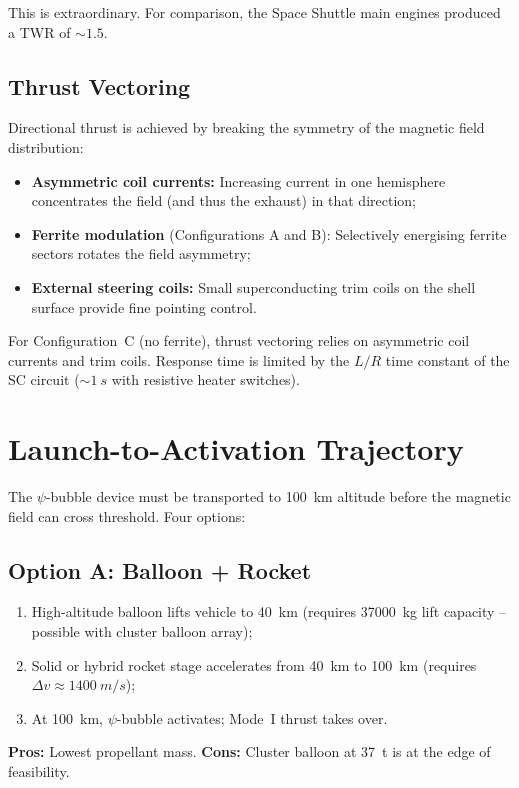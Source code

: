 \documentclass[11pt,a4paper]{article}
\begin{document}
This is extraordinary. For comparison, the Space Shuttle main engines
produced a TWR of $\sim\!1.5$.

\subsection{Thrust Vectoring}

Directional thrust is achieved by breaking the symmetry of the magnetic
field distribution:
\begin{itemize}[nosep]
\item \textbf{Asymmetric coil currents:} Increasing current in one hemisphere
concentrates the field (and thus the exhaust) in that direction;
\item \textbf{Ferrite modulation} (Configurations A and B): Selectively
energising ferrite sectors rotates the field asymmetry;
\item \textbf{External steering coils:} Small superconducting trim coils
on the shell surface provide fine pointing control.
\end{itemize}

For Configuration~C (no ferrite), thrust vectoring relies on asymmetric
coil currents and trim coils. Response time is limited by the $L/R$ time
constant of the SC circuit ($\sim\!\SI{1}{s}$ with resistive heater switches).

\section{Launch-to-Activation Trajectory}\label{sec:launch}

The $\psi$-bubble device must be transported to \SI{100}{km} altitude before
the magnetic field can cross threshold. Four options:

\subsection{Option A: Balloon + Rocket}

\begin{enumerate}[nosep]
\item High-altitude balloon lifts vehicle to \SI{40}{km} (requires
\SI{37000}{kg} lift capacity -- possible with cluster balloon array);
\item Solid or hybrid rocket stage accelerates from \SI{40}{km} to
\SI{100}{km} (requires $\Delta v \approx \SI{1400}{m/s}$);
\item At \SI{100}{km}, $\psi$-bubble activates; Mode~I thrust takes over.
\end{enumerate}
\textbf{Pros:} Lowest propellant mass. \textbf{Cons:} Cluster balloon
at \SI{37}{t} is at the edge of feasibility.
\end{document}
